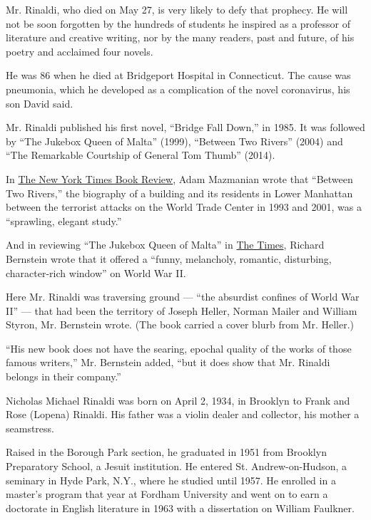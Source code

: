 Mr. Rinaldi, who died on May 27, is very likely to defy that prophecy.
He will not be soon forgotten by the hundreds of students he inspired as
a professor of literature and creative writing, nor by the many readers,
past and future, of his poetry and acclaimed four novels.

He was 86 when he died at Bridgeport Hospital in Connecticut. The cause
was pneumonia, which he developed as a complication of the novel
coronavirus, his son David said.

Mr. Rinaldi published his first novel, ``Bridge Fall Down,'' in 1985. It
was followed by ``The Jukebox Queen of Malta'' (1999), ``Between Two
Rivers'' (2004) and ``The Remarkable Courtship of General Tom Thumb''
(2014).

In
\href{https://www.nytimes3xbfgragh.onion/2004/06/20/books/books-in-brief-fiction-937886.html}{The
New York Times Book Review}, Adam Mazmanian wrote that ``Between Two
Rivers,'' the biography of a building and its residents in Lower
Manhattan between the terrorist attacks on the World Trade Center in
1993 and 2001, was a ``sprawling, elegant study.''

And in reviewing ``The Jukebox Queen of Malta'' in
\href{https://www.nytimes3xbfgragh.onion/1999/07/14/books/books-of-the-times-the-attractions-of-malta-don-t-include-egg-creams.html}{The
Times}, Richard Bernstein wrote that it offered a ``funny, melancholy,
romantic, disturbing, character-rich window'' on World War II.

Here Mr. Rinaldi was traversing ground --- ``the absurdist confines of
World War II'' --- that had been the territory of Joseph Heller, Norman
Mailer and William Styron, Mr. Bernstein wrote. (The book carried a
cover blurb from Mr. Heller.)

``His new book does not have the searing, epochal quality of the works
of those famous writers,'' Mr. Bernstein added, ``but it does show that
Mr. Rinaldi belongs in their company.''

Nicholas Michael Rinaldi was born on April 2, 1934, in Brooklyn to Frank
and Rose (Lopena) Rinaldi. His father was a violin dealer and collector,
his mother a seamstress.

Raised in the Borough Park section, he graduated in 1951 from Brooklyn
Preparatory School, a Jesuit institution. He entered St.
Andrew-on-Hudson, a seminary in Hyde Park, N.Y., where he studied until
1957. He enrolled in a master's program that year at Fordham University
and went on to earn a doctorate in English literature in 1963 with a
dissertation on William Faulkner.

